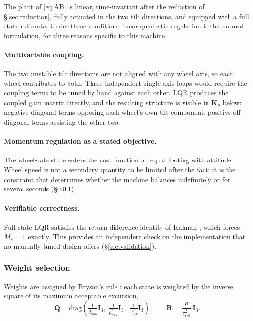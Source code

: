 The plant of \eqref{eq:AB} is linear, time-invariant after the reduction of
\S\ref{sec:reduction}, fully actuated in the two tilt directions, and
equipped with a full state estimate. Under these conditions linear quadratic
regulation is the natural formulation, for three reasons specific to this
machine.

\paragraph{Multivariable coupling.} The two unstable tilt directions are not
aligned with any wheel axis, so each wheel contributes to both. Three
independent single-axis loops would require the coupling terms to be tuned by
hand against each other. LQR produces the coupled gain matrix directly, and
the resulting structure is visible in $\bm{K}_p$ below: negative diagonal
terms opposing each wheel's own tilt component, positive off-diagonal terms
assisting the other two.

\paragraph{Momentum regulation as a stated objective.} The wheel-rate state
enters the cost function on equal footing with attitude. Wheel speed is not a
secondary quantity to be limited after the fact; it is the constraint that
determines whether the machine balances indefinitely or for several seconds
(\S\ref{sec:bryson}).

\paragraph{Verifiable correctness.} Full-state LQR satisfies the
return-difference identity of Kalman \cite{kalman1964optimal}, which forces
$M_s = 1$ exactly. This provides an independent check on the implementation
that no manually tuned design offers (\S\ref{sec:validation}).

\subsubsection{Weight selection}
\label{sec:bryson}

Weights are assigned by Bryson's rule \cite{bryson1969applied}: each state is
weighted by the inverse square of its maximum acceptable excursion,
%
\begin{equation}
  \bm{Q} = \mathrm{diag}\!\left(
    \tfrac{1}{\theta_{\max}^2}\bm{I}_3,\;
    \tfrac{1}{\dot\theta_{\max}^2}\bm{I}_3,\;
    \tfrac{1}{\omega_{\mathrm{des}}^2}\bm{I}_3 \right),
  \qquad
  \bm{R} = \frac{\rho}{\tau_{\mathrm{ref}}^2}\,\bm{I}_3 .
  \label{eq:bryson}
\end{equation}

